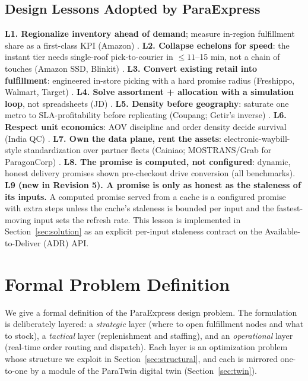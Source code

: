\documentclass[10pt,twocolumn,letterpaper]{article}
\theoremstyle{definition}
\begin{document}
\subsection{Design Lessons Adopted by ParaExpress}
\textbf{L1. Regionalize inventory ahead of demand}; measure in-region fulfillment share as a first-class KPI (Amazon) \cite{chandra2026}.
\textbf{L2. Collapse echelons for speed}: the instant tier needs single-roof pick-to-courier in $\leq 11$--15 min, not a chain of touches (Amazon SSD, Blinkit) \cite{costar2024,storyboard2025}.
\textbf{L3. Convert existing retail into fulfillment}: engineered in-store picking with a hard promise radius (Freshippo, Walmart, Target) \cite{vangaalen2022,scd2025,target2023}.
\textbf{L4. Solve assortment + allocation with a simulation loop}, not spreadsheets (JD) \cite{wang2025}.
\textbf{L5. Density before geography}: saturate one metro to SLA-profitability before replicating (Coupang; Getir's inverse) \cite{goodwater2021,browne2024}.
\textbf{L6. Respect unit economics}: AOV discipline and order density decide survival (India QC) \cite{mohan2025}.
\textbf{L7. Own the data plane, rent the assets}: electronic-waybill-style standardization over partner fleets (Cainiao; MOSTRANS/Grab for ParagonCorp) \cite{wirechina2024,grab2025}.
\textbf{L8. The promise is computed, not configured}: dynamic, honest delivery promises shown pre-checkout drive conversion (all benchmarks).
\textbf{L9 (new in Revision 5). A promise is only as honest as the staleness of its inputs.} A computed promise served from a cache is a configured promise with extra steps unless the cache's staleness is bounded per input and the fastest-moving input sets the refresh rate. This lesson is implemented in Section~\ref{sec:solution} as an explicit per-input staleness contract on the Available-to-Deliver (ADR) API.

\section{Formal Problem Definition}\label{sec:formal}

We give a formal definition of the ParaExpress design problem. The formulation is deliberately layered: a \emph{strategic} layer (where to open fulfillment nodes and what to stock), a \emph{tactical} layer (replenishment and staffing), and an \emph{operational} layer (real-time order routing and dispatch). Each layer is an optimization problem whose structure we exploit in Section~\ref{sec:structural}, and each is mirrored one-to-one by a module of the ParaTwin digital twin (Section~\ref{sec:twin}).
\end{document}
